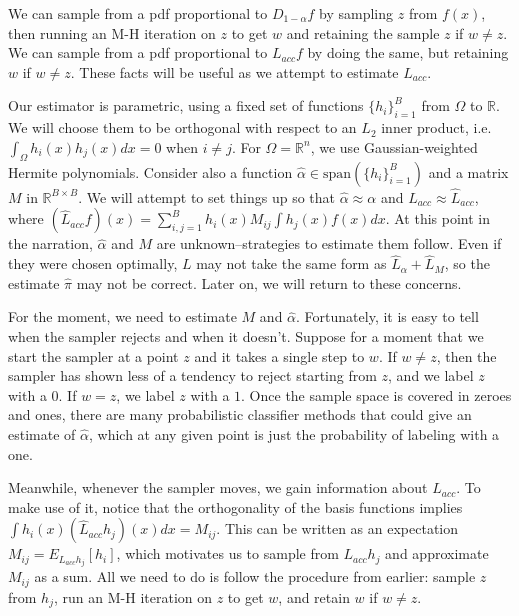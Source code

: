 \documentclass{article}
\begin{document}
We can sample from a pdf proportional to $D_{1-\alpha}f$ by sampling $z$ from $f(x)$, then running an M-H iteration on $z$ to get $w$ and retaining the sample $z$ if $w \neq z$. We can sample from a pdf proportional to $L_{acc}f$ by doing the same, but retaining $w$ if $w \neq z$. These facts will be useful as we attempt to estimate $L_{acc}$.

Our estimator is parametric, using a fixed set of functions $\{h_i\}_{i=1}^B$ from $\Omega$ to $\mathbb{R}$. We will choose them to be orthogonal with respect to an $L_2$ inner product, i.e. $\int_{\Omega} h_i(x)h_j(x)dx = 0$ when $i \neq j$. For $\Omega=\mathbb{R}^n$, we use Gaussian-weighted Hermite polynomials. Consider also a function $\hat{\alpha} \in \text{span}(\{h_i\}_{i=1}^B)$ and a matrix $M$ in $\mathbb{R}^{B\times B}$.  We will attempt to set things up so that $\hat{\alpha}\approx{\alpha}$ and $L_{acc} \approx \hat{L}_{acc}$, where $(\hat{L}_{acc}f)(x) =\sum_{i,j=1}^B h_i(x)M_{ij}\int h_j(x)f(x)dx$. At this point in the narration, $\hat{\alpha}$ and $M$ are unknown--strategies to estimate them follow. Even if they were chosen optimally, $L$ may not take the same form as $\hat{L}_{\alpha}+\hat{L}_{M}$, so the estimate $\hat{\pi}$ may not be correct. Later on, we will return to these concerns.

For the moment, we need to estimate $M$ and $\hat{\alpha}$. Fortunately, it is easy to tell when the sampler rejects and when it doesn't. Suppose for a moment that we start the sampler at a point $z$ and it takes a single step to $w$. If $w \neq z$, then the sampler has shown less of a tendency to reject starting from $z$, and we label $z$ with a $0$. If $w = z$, we label $z$ with a $1$. Once the sample space is covered in zeroes and ones, there are many probabilistic classifier methods that could give an estimate of $\hat{\alpha}$, which at any given point is just the probability of labeling with a one. 

Meanwhile, whenever the sampler moves, we gain information about $L_{acc}$. To make use of it, notice that the orthogonality of the basis functions implies $\int h_i(x)(\hat{L}_{acc}h_j)(x)dx =  M_{ij}$. This can be written as an expectation $M_{ij} = E_{L_{acc}h_j}[h_i]$, which motivates us to sample from $L_{acc}h_j$ and approximate $M_{ij}$ as a sum. All we need to do is follow the procedure from earlier: sample $z$ from $h_j$, run an M-H iteration on $z$ to get $w$, and retain $w$ if $w \neq z$. 
\end{document}
